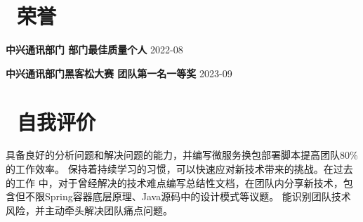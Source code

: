 \documentclass[10pt, a4paper]{article}
\begin{document}
\section{\color{CVBlue}\faHeart\ 荣誉}

\textbf{中兴通讯部门 \quad 部门最佳质量个人} \hfill 2022-08

\textbf{中兴通讯部门黑客松大赛 \quad 团队第一名一等奖} \hfill 2023-09

\section{\color{CVBlue}\faChalkboard\ 自我评价}

\quad\quad 具备良好的分析问题和解决问题的能力，并编写微服务换包部署脚本提高团队80\%的工作效率。
保持着持续学习的习惯，可以快速应对新技术带来的挑战。在过去的工作
中，对于曾经解决的技术难点编写总结性文档，在团队内分享新技术，包含但不限Spring容器底层原理、Java源码中的设计模式等议题。
能识别团队技术风险，并主动牵头解决团队痛点问题。
\quad\quad 
\end{document}
